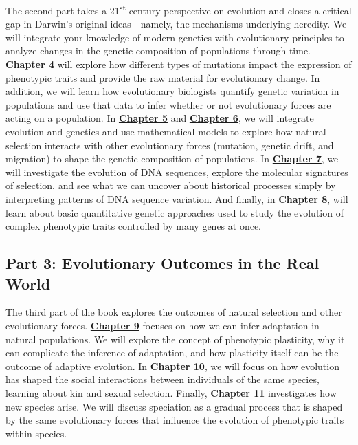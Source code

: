 \documentclass[
]{book}
\begin{document}
The second part takes a 21\textsuperscript{st} century perspective on evolution and closes a critical gap in Darwin's original ideas---namely, the mechanisms underlying heredity. We will integrate your knowledge of modern genetics with evolutionary principles to analyze changes in the genetic composition of populations through time. \href{the-raw-materials-for-evolution.html}{\textbf{Chapter 4}} will explore how different types of mutations impact the expression of phenotypic traits and provide the raw material for evolutionary change. In addition, we will learn how evolutionary biologists quantify genetic variation in populations and use that data to infer whether or not evolutionary forces are acting on a population. In \href{evolutionary-mechanisms-i-modeling-natural-selection.html}{\textbf{Chapter 5}} and \href{evolutionary-mechanisms-ii-mutation-genetic-drift-and-migration.html}{\textbf{Chapter 6}}, we will integrate evolution and genetics and use mathematical models to explore how natural selection interacts with other evolutionary forces (mutation, genetic drift, and migration) to shape the genetic composition of populations. In \href{molecular-evolution.html}{\textbf{Chapter 7}}, we will investigate the evolution of DNA sequences, explore the molecular signatures of selection, and see what we can uncover about historical processes simply by interpreting patterns of DNA sequence variation. And finally, in \href{the-evolution-of-quantitative-traits.html}{\textbf{Chapter 8}}, will learn about basic quantitative genetic approaches used to study the evolution of complex phenotypic traits controlled by many genes at once.

\hypertarget{part-3-evolutionary-outcomes-in-the-real-world}{%
\subsection*{Part 3: Evolutionary Outcomes in the Real World}\label{part-3-evolutionary-outcomes-in-the-real-world}}

The third part of the book explores the outcomes of natural selection and other evolutionary forces. \href{adaptation-and-phenotypic-plasticity.html}{\textbf{Chapter 9}} focuses on how we can infer adaptation in natural populations. We will explore the concept of phenotypic plasticity, why it can complicate the inference of adaptation, and how plasticity itself can be the outcome of adaptive evolution. In \href{intraspecific-interactions-social-behavior-and-sexual-selection.html}{\textbf{Chapter 10}}, we will focus on how evolution has shaped the social interactions between individuals of the same species, learning about kin and sexual selection. Finally, \href{speciation-1.html}{\textbf{Chapter 11}} investigates how new species arise. We will discuss speciation as a gradual process that is shaped by the same evolutionary forces that influence the evolution of phenotypic traits within species.
\end{document}
